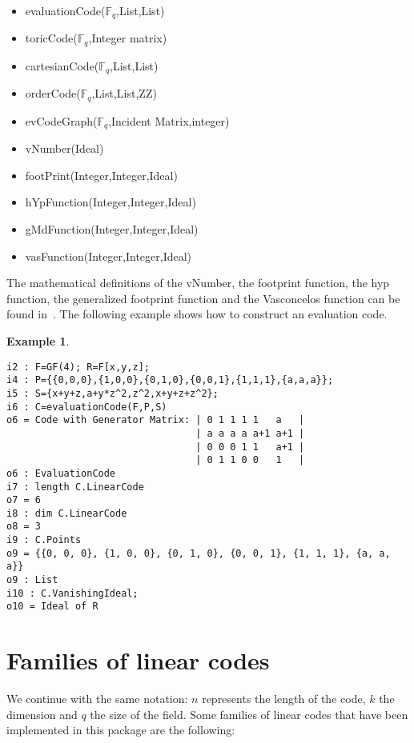\documentclass[12pt]{amsart}
\theoremstyle{plain}
\newtheorem{example}[theorem]{Example}
\begin{document}
\medskip

\begin{minipage}[t]{0.52\textwidth}
\begin{itemize}[leftmargin=0.55 cm]
\item evaluationCode($\mathbb{F}_q$,List,List)
\item toricCode($\mathbb{F}_q$,Integer matrix)
\item cartesianCode($\mathbb{F}_q$,List,List)
\item orderCode($\mathbb{F}_q$,List,List,ZZ)
\item evCodeGraph($\mathbb{F}_q$,Incident Matrix,integer)
\end{itemize}
\end{minipage}
\begin{minipage}[t]{0.45\textwidth}
\begin{itemize}[leftmargin=1 cm]
\item vNumber(Ideal)
\item footPrint(Integer,Integer,Ideal)
\item hYpFunction(Integer,Integer,Ideal)
\item gMdFunction(Integer,Integer,Ideal)
\item vasFunction(Integer,Integer,Ideal)
\end{itemize}
\end{minipage}

\medskip

The mathematical definitions of the vNumber, the footprint function, the hyp function, the generalized footprint function and the Vasconcelos function can be found in~\cite{CSTVV}. The following example shows how to construct an evaluation code.

\begin{example}
$\,$
\begin{verbatim}
i2 : F=GF(4); R=F[x,y,z];
i4 : P={{0,0,0},{1,0,0},{0,1,0},{0,0,1},{1,1,1},{a,a,a}};
i5 : S={x+y+z,a+y*z^2,z^2,x+y+z+z^2};
i6 : C=evaluationCode(F,P,S)
o6 = Code with Generator Matrix: | 0 1 1 1 1   a   |
                                 | a a a a a+1 a+1 |
                                 | 0 0 0 1 1   a+1 |
                                 | 0 1 1 0 0   1   |
o6 : EvaluationCode
i7 : length C.LinearCode
o7 = 6
i8 : dim C.LinearCode
o8 = 3
i9 : C.Points
o9 = {{0, 0, 0}, {1, 0, 0}, {0, 1, 0}, {0, 0, 1}, {1, 1, 1}, {a, a, a}}
o9 : List
i10 : C.VanishingIdeal;
o10 = Ideal of R
\end{verbatim}
\end{example}
\section{Families of linear codes}\label{families}
We continue with the same notation: $n$ represents the length of the code, $k$ the dimension and $q$ the size of the field.
Some families of linear codes that have been implemented in this package are the following:
\end{document}
